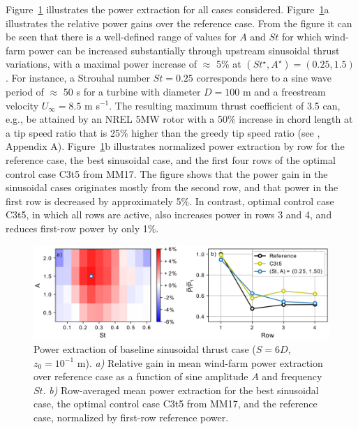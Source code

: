 \documentclass[wes, manuscript]{copernicus}
\begin{document}
Figure~\ref{fig:sinus_baseline} illustrates the power extraction for all cases considered. Figure~\ref{fig:sinus_baseline}a illustrates the relative power gains over the reference case. From the figure it can be seen that there is a well-defined range of values for $A$ and $St$ for which wind-farm power can be increased substantially through upstream sinusoidal thrust variations, with a maximal power increase of $\approx$ 5\% at $(St^\star, A^\star) = (0.25, 1.5)$. For instance, a Strouhal number $St = 0.25$ corresponds here to a sine wave period of $\approx$ 50 s for a turbine with diameter $D = 100$ m and a freestream velocity $U_\infty = 8.5$ m s$^{-1}$. The resulting maximum thrust coefficient of 3.5 can, e.g., be attained by an NREL 5MW rotor with a 50\% increase in chord length at a tip speed ratio that is 25\% higher than the greedy tip speed ratio (see \citealp{goit2015optimal}, Appendix A). Figure~\ref{fig:sinus_baseline}b illustrates normalized power extraction by row for the reference case, the best sinusoidal case, and the first four rows of the optimal control case C3t5 from MM17. The figure shows that the power gain in the sinusoidal cases originates mostly from the second row, and that power in the first row is decreased by approximately 5\%. In contrast, optimal control case C3t5, in which all rows are active, also increases power in rows 3 and 4, and reduces first-row power by only 1\%. 
\begin{figure}
	\centering
	\includegraphics[width=\textwidth]{figure14}
	\caption{Power extraction of baseline sinusoidal thrust case ($S = 6D$, $z_0 = 10^{-1}$ m). \emph{a) } Relative gain in mean wind-farm power extraction over reference case as a function of sine amplitude $A$ and frequency $St$. \emph{b) } Row-averaged mean power extraction for the best sinusoidal case, the optimal control case C3t5 from MM17, and the reference case, normalized by first-row reference power.\label{fig:sinus_baseline} }
\end{figure}
\end{document}
